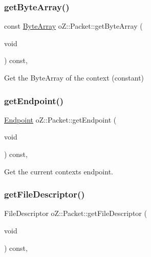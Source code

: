 \subsubsection{\texorpdfstring{getByteArray()}{getByteArray()}\hspace{0.1cm}{\footnotesize\ttfamily [2/2]}}
{\footnotesize\ttfamily const \mbox{\hyperlink{namespaceo_z_abfa3f5a46e5c7584615dc1dd33fcafb6}{Byte\+Array}} o\+Z\+::\+Packet\+::get\+Byte\+Array (\begin{DoxyParamCaption}\item[{void}]{ }\end{DoxyParamCaption}) const\hspace{0.3cm}{\ttfamily [inline]}, {\ttfamily [noexcept]}}



Get the Byte\+Array of the context (constant) 

\mbox{\label{classo_z_1_1_packet_a89367cc491fdfdb6bf88eda9bc4eb219}} 
\subsubsection{\texorpdfstring{getEndpoint()}{getEndpoint()}}
{\footnotesize\ttfamily \mbox{\hyperlink{classo_z_1_1_endpoint}{Endpoint}} o\+Z\+::\+Packet\+::get\+Endpoint (\begin{DoxyParamCaption}\item[{void}]{ }\end{DoxyParamCaption}) const\hspace{0.3cm}{\ttfamily [inline]}, {\ttfamily [noexcept]}}



Get the current context\textquotesingle{}s endpoint. 

\mbox{\label{classo_z_1_1_packet_a65cfd7021de4eaf78f716143b82cd4a1}} 
\subsubsection{\texorpdfstring{getFileDescriptor()}{getFileDescriptor()}}
{\footnotesize\ttfamily File\+Descriptor o\+Z\+::\+Packet\+::get\+File\+Descriptor (\begin{DoxyParamCaption}\item[{void}]{ }\end{DoxyParamCaption}) const\hspace{0.3cm}{\ttfamily [inline]}, {\ttfamily [noexcept]}}




